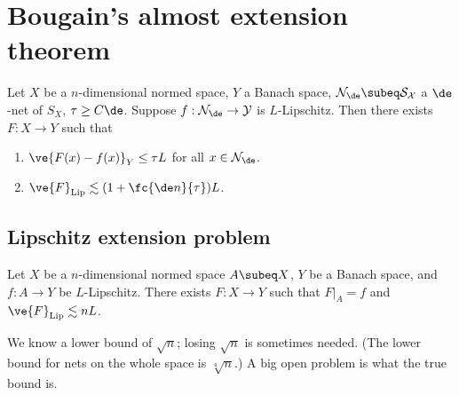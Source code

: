 

\section{Bougain's almost extension theorem}
%
\begin{thm} 
\label{thm:baet}
Let $X$ be a $n$-dimensional normed space, $Y$ a Banach space, $\cal N_\de\subeq S_X$ a $\de$-net of $S_X$, $\tau\ge C\de$. Suppose $f:\cal N_\de\to Y$ is $L$-Lipschitz. Then there exists $F:X\to Y$ such that 
\begin{enumerate}
\item $\ve{F(x)-f(x)}_Y\le \tau L$ for all $x\in \cal N_\de$. 
\item $\ve{F}_{\text{Lip}} \lesssim (1+\fc{\de n}{\tau}) L$.
\end{enumerate}
\end{thm}
\subsection{Lipschitz extension problem}

\begin{thm}
Let $X$ be a $n$-dimensional normed space $A\subeq X$, $Y$ be a Banach space, and $f:A\to Y$ be $L$-Lipschitz. There exists $F:X\to Y$ such that $F|_A=f$ and $\ve{F}_{\text{Lip}}\lesssim nL$.
\end{thm}
We know a lower bound of $\sqrt n$; losing $\sqrt n$ is sometimes needed. (The lower bound for nets on the whole space is $\sqrt[4]{n}$.) A big open problem is what the true bound is. 


